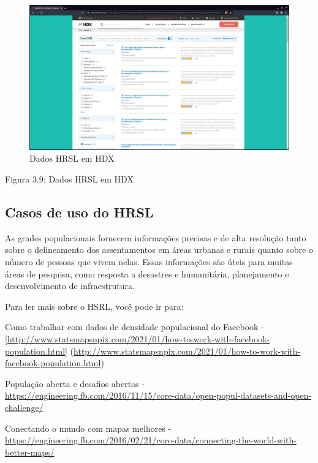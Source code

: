 \documentclass[
]{krantz}
\begin{document}
\begin{figure}
\centering
\includegraphics{media/modulo3/hdx.png}
\caption{Dados HRSL em HDX}
\end{figure}

Figura 3.9: Dados HRSL em HDX

\hypertarget{casos-de-uso-do-hrsl}{%
\subsection{Casos de uso do HRSL}\label{casos-de-uso-do-hrsl}}

As grades populacionais fornecem informações precisas e de alta resolução tanto sobre o delineamento dos assentamentos em áreas urbanas e rurais quanto sobre o número de pessoas que vivem nelas. Essas informações são úteis para muitas áreas de pesquisa, como resposta a desastres e humanitária, planejamento e desenvolvimento de infraestrutura.

Para ler mais sobre o HSRL, você pode ir para:

Como trabalhar com dados de densidade populacional do Facebook - {[}\url{http://www.statsmapsnpix.com/2021/01/how-to-work-with-facebook-population.html}{]} (\url{http://www.statsmapsnpix.com/2021/01/how-to-work-with-facebook-population.html})

População aberta e desafios abertos - \href{https://engineering.fb.com/2016/11/15/core-data/open-population-datasets-and-open-desafios/}{https://engineering.fb.com/2016/11/15/core-data/open-popul-datasets-and-open-challenge/}

Conectando o mundo com mapas melhores - \href{https://engineering.fb.com/2016/02/21/core-data/Connecting-the-world-with-better-maps/}{https://engineering.fb.com/2016/02/21/core-data/connecting-the-world-with-better-maps/}
\end{document}
